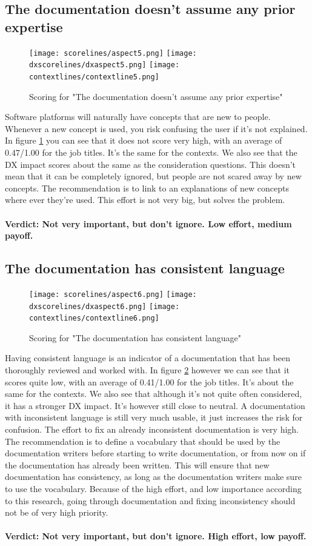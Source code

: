 \documentclass{cslthse-msc}
\begin{document}
    \subsection{The documentation doesn’t assume any prior expertise}
    \begin{figure}[H]
        \centering
        \texttt{[image: scorelines/aspect5.png]}
        \texttt{[image: dxscorelines/dxaspect5.png]}
        \texttt{[image: contextlines/contextline5.png]}
        \caption{Scoring for "The documentation doesn’t assume any prior expertise"}
        \label{fig:aspect5}
    \end{figure}
    Software platforms will naturally have concepts that are new to people. Whenever a new concept is used, you risk confusing the user if it's not explained. In figure \ref{fig:aspect5} you can see that it does not score very high, with an average of 0.47/1.00 for the job titles. It's the same for the contexts. We also see that the DX impact scores about the same as the consideration questions. This doesn't mean that it can be completely ignored, but people are not scared away by new concepts. The recommendation is to link to an explanations of new concepts where ever they're used. This effort is not very big, but solves the problem. \\ \\
    \textbf{Verdict: Not very important, but don't ignore. Low effort, medium payoff.}
    \subsection{The documentation has consistent language}
    \begin{figure}[H]
        \centering
        \texttt{[image: scorelines/aspect6.png]}
        \texttt{[image: dxscorelines/dxaspect6.png]}
        \texttt{[image: contextlines/contextline6.png]}
        \caption{Scoring for "The documentation has consistent language"}
        \label{fig:aspect6}
    \end{figure}
    Having consistent language is an indicator of a documentation that has been thoroughly reviewed and worked with. In figure \ref{fig:aspect6} however we can see that it scores quite low, with an average of 0.41/1.00 for the job titles. It's about the same for the contexts. We also see that although it's not quite often considered, it has a stronger DX impact. It's however still close to neutral. A documentation with inconsistent language is still very much usable, it just increases the risk for confusion. The effort to fix an already inconsistent documentation is very high. The recommendation is to define a vocabulary that should be used by the documentation writers before starting to write documentation, or from now on if the documentation has already been written. This will ensure that new documentation has consistency, as long as the documentation writers make sure to use the vocabulary. Because of the high effort, and low importance according to this research, going through documentation and fixing inconsistency should not be of very high priority.\\ \\
    \textbf{Verdict: Not very important, but don't ignore. High effort, low payoff.}
\end{document}
